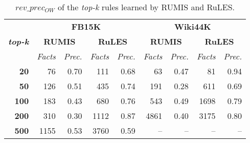 



\begin{table}[t]
\scriptsize
\centering
\begin{tabular}{r | r r| r r | r r |r r}
 \multirow{3}{*}{\textbf{\textit{top-k}}} & \multicolumn{4}{c}{\textbf{FB15K}} & \multicolumn{4}{|c}{\textbf{Wiki44K}} \\
 \cmidrule{2-9}&\multicolumn{2}{c}{\textbf{RUMIS}}&\multicolumn{2}{|c}{\textbf{RuLES}}&\multicolumn{2}{|c}{\textbf{RUMIS}}&\multicolumn{2}{|c}{\textbf{RuLES}} \\
& \emph{Facts} & \emph{Prec.} & \emph{Facts} & \emph{Prec.} & \emph{Facts} & \emph{Prec.}& \emph{Facts} & \emph{Prec.} \\
 \midrule
\textbf{20} & 76 & 0.70 & 111 & 0.68 & 63 & 0.47 & 81 & 0.94 \\
\textbf{50} & 126 & 0.51 & 435 & 0.74 & 191 & 0.28 & 611 & 0.69 \\
\textbf{100} & 183 & 0.43 & 680 & 0.76 & 543 & 0.49 & 1698 & 0.79 \\
\textbf{200} & 310 & 0.30 & 1112 & 0.87 & 4861 & 0.40 & 3175 & 0.80 \\
\textbf{500} & 1155 & 0.53 & 3760 & 0.59 & -- & -- & -- & -- \\
\bottomrule
\end{tabular}
\caption{$rev\_prec_{OW}$ of the \textit{top-k} rules learned by RUMIS and RuLES.}
\label{table:exception_revision_result}
\vspace*{-3mm}
\end{table}




